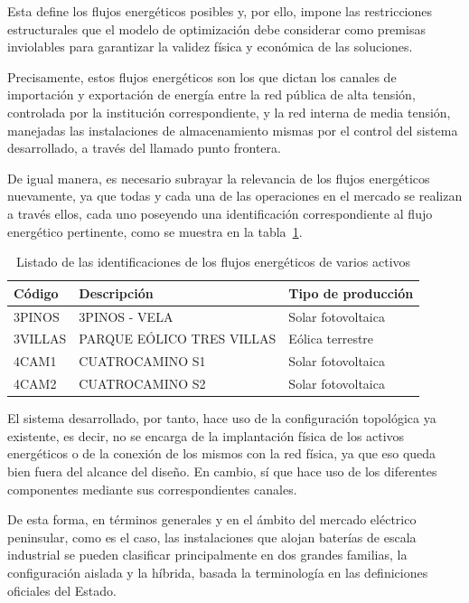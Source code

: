 Esta define los flujos energéticos posibles y, por ello, impone las restricciones estructurales que el modelo de optimización debe considerar como premisas inviolables para garantizar la validez física y económica de las soluciones.

Precisamente, estos flujos energéticos son los que dictan los canales de importación y exportación de energía entre la red pública de alta tensión, controlada por la institución correspondiente, y la red interna de media tensión, manejadas las instalaciones de almacenamiento mismas por el control del sistema desarrollado, a través del llamado punto frontera.

De igual manera, es necesario subrayar la relevancia de los flujos energéticos nuevamente, ya que todas y cada una de las operaciones en el mercado se realizan a través ellos, cada uno poseyendo una identificación correspondiente al flujo energético pertinente, como se muestra en la tabla~\ref{tab:unidades-físicas}.

\begin{table}[ht]
\centering
\begin{tabular}[c]{|l|l|l|}
\hline
Código  & Descripción               & Tipo de producción \\
\hline
3PINOS  & 3PINOS - VELA             & Solar fotovoltaica  \\
3VILLAS & PARQUE EÓLICO TRES VILLAS & Eólica terrestre   \\
4CAM1   & CUATROCAMINO S1           & Solar fotovoltaica  \\
4CAM2   & CUATROCAMINO S2           & Solar fotovoltaica  \\
\hline
\end{tabular}
\caption{Listado de las identificaciones de los flujos energéticos de varios activos}
\label{tab:unidades-físicas}
\end{table}

El sistema desarrollado, por tanto, hace uso de la configuración topológica ya existente, es decir, no se encarga de la implantación física de los activos energéticos o de la conexión de los mismos con la red física, ya que eso queda bien fuera del alcance del diseño. En cambio, sí que hace uso de los diferentes componentes mediante sus correspondientes canales.

De esta forma, en términos generales y en el ámbito del mercado eléctrico peninsular, como es el caso, las instalaciones que alojan baterías de escala industrial se pueden clasificar principalmente en dos grandes familias, la configuración aislada y la híbrida, basada la terminología en las definiciones oficiales del Estado.

